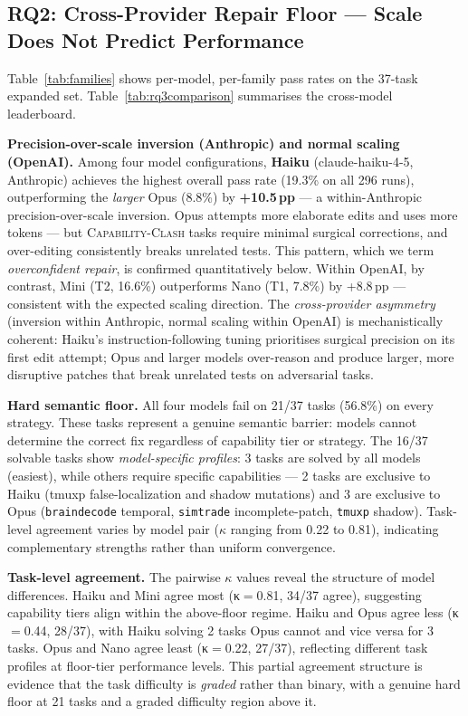 \documentclass[sigconf,review,anonymous]{acmart}
\newcommand{\ccbench}{\textsc{Capability-Clash}}
\newcommand{\pp}{\,pp}
\begin{document}
\subsection{RQ2: Cross-Provider Repair Floor — Scale Does Not Predict Performance}
\label{sec:rq2}

Table~\ref{tab:families} shows per-model, per-family pass rates on the 37-task expanded set. Table~\ref{tab:rq3comparison} summarises the cross-model leaderboard.

\textbf{Precision-over-scale inversion (Anthropic) and normal scaling (OpenAI).} Among four model configurations, \textbf{Haiku} (claude-haiku-4-5, Anthropic) achieves the highest overall pass rate (19.3\% on all 296 runs), outperforming the \emph{larger} Opus (8.8\%) by \textbf{+10.5\pp{}} — a within-Anthropic precision-over-scale inversion. Opus attempts more elaborate edits and uses more tokens — but \ccbench{} tasks require minimal surgical corrections, and over-editing consistently breaks unrelated tests. This pattern, which we term \emph{overconfident repair}, is confirmed quantitatively below. Within OpenAI, by contrast, Mini (T2, 16.6\%) outperforms Nano (T1, 7.8\%) by +8.8\pp{} — consistent with the expected scaling direction. The \emph{cross-provider asymmetry} (inversion within Anthropic, normal scaling within OpenAI) is mechanistically coherent: Haiku's instruction-following tuning prioritises surgical precision on its first edit attempt; Opus and larger models over-reason and produce larger, more disruptive patches that break unrelated tests on adversarial tasks.

\textbf{Hard semantic floor.} All four models fail on 21/37 tasks (56.8\%) on every strategy. These tasks represent a genuine semantic barrier: models cannot determine the correct fix regardless of capability tier or strategy. The 16/37 solvable tasks show \emph{model-specific profiles}: 3 tasks are solved by all models (easiest), while others require specific capabilities — 2 tasks are exclusive to Haiku (tmuxp false-localization and shadow mutations) and 3 are exclusive to Opus (\texttt{braindecode} temporal, \texttt{simtrade} incomplete-patch, \texttt{tmuxp} shadow). Task-level agreement varies by model pair ($\kappa$ ranging from 0.22 to 0.81), indicating complementary strengths rather than uniform convergence.

\textbf{Task-level agreement.}
The pairwise $\kappa$ values reveal the structure of model differences.
Haiku and Mini agree most (κ$=$0.81, 34/37 agree), suggesting capability tiers align within the above-floor regime.
Haiku and Opus agree less (κ$=$0.44, 28/37), with Haiku solving 2 tasks Opus cannot and vice versa for 3 tasks.
Opus and Nano agree least (κ$=$0.22, 27/37), reflecting different task profiles at floor-tier performance levels.
This partial agreement structure is evidence that the task difficulty is \emph{graded} rather than binary, with a genuine hard floor at 21 tasks and a graded difficulty region above it.
\end{document}
